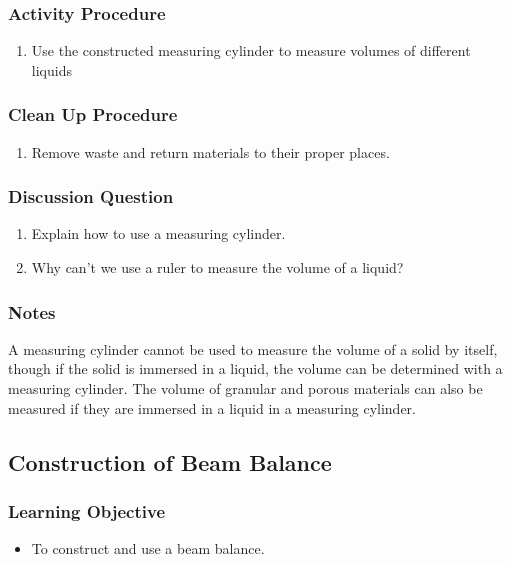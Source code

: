 \subsubsection*{Activity Procedure}
\begin{enumerate}
\item{Use the constructed measuring cylinder to measure volumes of different liquids}
\end{enumerate}

\subsubsection*{Clean Up Procedure}
\begin{enumerate}
\item{Remove waste and return materials to their proper places.}
\end{enumerate}

\subsubsection*{Discussion Question}
\begin{enumerate}
\item{Explain how to use a measuring cylinder.}
\item{Why can't we use a ruler to measure the volume of a liquid?}
\end{enumerate}

\subsubsection*{Notes}
A measuring cylinder cannot be used to measure the volume of a solid by itself, though if the solid is immersed in a liquid, the volume can be determined with a measuring cylinder. The volume of granular and porous materials can also be measured if they are immersed in a liquid in a measuring cylinder.

\subsection{Construction of Beam Balance}

\subsubsection*{Learning Objective}
\begin{itemize}
\item{To construct and use a beam balance.} 
\end{itemize}

